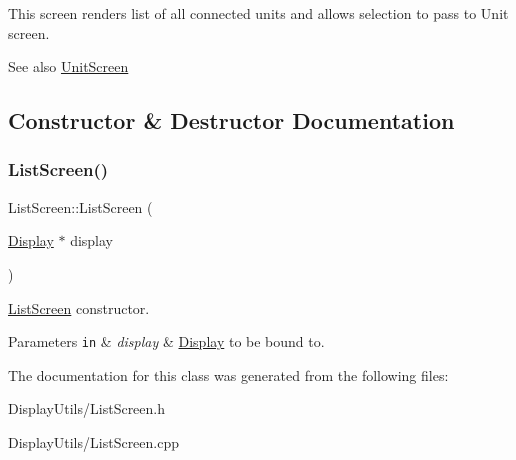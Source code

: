 This screen renders list of all connected units and allows selection to pass to Unit screen. \begin{DoxySeeAlso}{See also}
\mbox{\hyperlink{classUnitScreen}{Unit\+Screen}} 
\end{DoxySeeAlso}


\subsection{Constructor \& Destructor Documentation}
\mbox{\label{classListScreen_a502ff7cf893ae6d10ed7bc1ca7a8ffe8}} 
\subsubsection{\texorpdfstring{List\+Screen()}{ListScreen()}}
{\footnotesize\ttfamily List\+Screen\+::\+List\+Screen (\begin{DoxyParamCaption}\item[{\mbox{\hyperlink{classDisplay}{Display}} $\ast$}]{display }\end{DoxyParamCaption})}



\mbox{\hyperlink{classListScreen}{List\+Screen}} constructor. 


\begin{DoxyParams}[1]{Parameters}
\mbox{\tt in}  & {\em display} & \mbox{\hyperlink{classDisplay}{Display}} to be bound to. \\
\hline
\end{DoxyParams}


The documentation for this class was generated from the following files\+:\begin{DoxyCompactItemize}
\item 
Display\+Utils/List\+Screen.\+h\item 
Display\+Utils/List\+Screen.\+cpp\end{DoxyCompactItemize}
